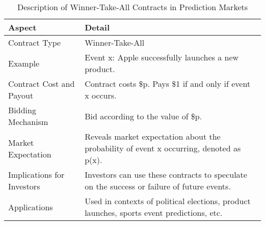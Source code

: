 \begin{table}[ht]
    \centering
    \begin{tabular}{@{}ll@{}}
        \toprule
        \textbf{Aspect}                & \textbf{Detail} \\ 
        \midrule
        Contract Type                  & Winner-Take-All \\ 
        \addlinespace
        Example                        & Event x: Apple successfully launches a new product. \\ 
        \addlinespace
        Contract Cost and Payout       & Contract costs \$p. Pays \$1 if and only if event x occurs. \\ 
        \addlinespace
        Bidding Mechanism              & Bid according to the value of \$p. \\ 
        \addlinespace
        Market Expectation             & Reveals market expectation about the probability of event x occurring, denoted as p(x). \\ 
        \addlinespace
        Implications for Investors     & Investors can use these contracts to speculate on the success or failure of future events. \\ 
        \addlinespace
        Applications                   & Used in contexts of political elections, product launches, sports event predictions, etc. \\ 
        \bottomrule
    \end{tabular}
    \caption{Description of Winner-Take-All Contracts in Prediction Markets}
    \label{tab:winner_take_all_contracts}
\end{table}
